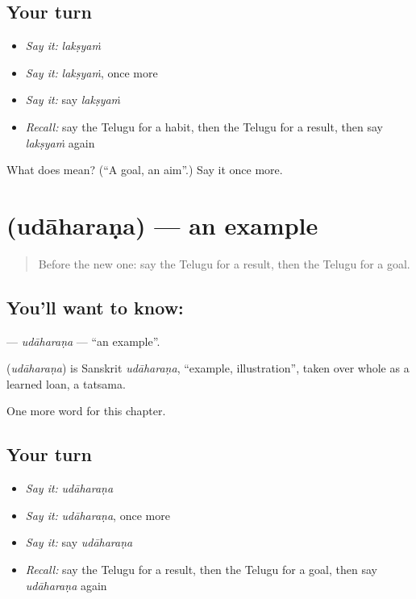 \subsection*{Your turn}
\begin{itemize}
\raggedright
  \item \emph{Say it:} \emph{lakṣyaṁ}
  \item \emph{Say it:} \emph{lakṣyaṁ}, once more
  \item \emph{Say it:} say \emph{lakṣyaṁ}
  \item \emph{Recall:} say the Telugu for a habit, then the Telugu for a result, then say \emph{lakṣyaṁ} again
\end{itemize}

\begin{tcolorbox}[breakable,colback=teal!4,colframe=teal!35!black,title={Before you move on}]
What does  mean? (\textquotedblleft{}A goal, an aim\textquotedblright{}.) Say it once more.
\end{tcolorbox}
\section[\texorpdfstring{\te{ఉదాహరణ} (udāharaṇa)}{ఉదాహరణ (udāharaṇa)}]{ (udāharaṇa) — an example}

\label{lesson:TE-C218-udaharana}



\begin{quote}
Before the new one: say the Telugu for a result, then the Telugu for a goal.
\end{quote}

\subsection*{You'll want to know: }
\textbf{} — \emph{udāharaṇa} — \textquotedblleft{}an example\textquotedblright{}.

\begin{cousinweb}
\textbf{} (\emph{udāharaṇa}) is Sanskrit \emph{udāharaṇa}, \textquotedblleft{}example, illustration\textquotedblright{}, taken over whole as a learned loan, a tatsama.
\end{cousinweb}

\begin{grammarlens}[title={What you've built}]
One more word for this chapter.
\end{grammarlens}

\subsection*{Your turn}
\begin{itemize}
\raggedright
  \item \emph{Say it:} \emph{udāharaṇa}
  \item \emph{Say it:} \emph{udāharaṇa}, once more
  \item \emph{Say it:} say \emph{udāharaṇa}
  \item \emph{Recall:} say the Telugu for a result, then the Telugu for a goal, then say \emph{udāharaṇa} again
\end{itemize}

